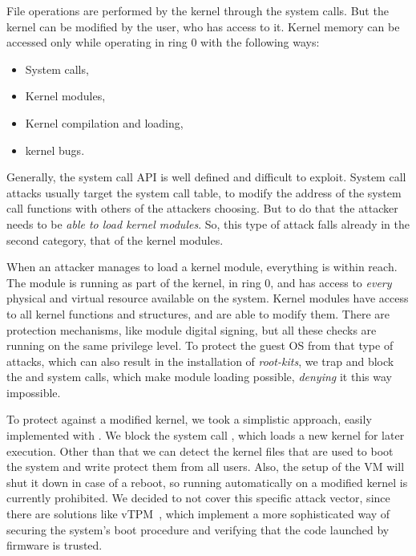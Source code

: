\par File operations are performed by the kernel through the system calls. But the kernel can be modified by the  user, who has access to it. Kernel memory can be accessed only while operating in ring 0 with the following ways:

\begin{itemize}
	\item System calls,
	\item Kernel modules,
	\item Kernel compilation and loading,
	\item kernel bugs.
\end{itemize}

\par Generally, the system call \ac{API} is well defined and difficult to exploit. System call attacks usually target the system call table, to modify the address of the system call functions with others of the attackers choosing. But to do that the attacker needs to be \emph{able to load kernel modules}. So, this type of attack falls already in the second category, that of the kernel modules.

\par When an attacker manages to load a kernel module, everything is within reach. The module is running as part of the kernel, in ring 0, and has access to \emph{every} physical and virtual resource available on the system. Kernel modules have access to all kernel functions and structures, and are able to modify them. There are protection mechanisms, like module digital signing, but all these checks are running on the same privilege level. To protect the guest \ac{OS} from that type of attacks, which can also result in the installation of \emph{root-kits}, we trap and block the  and  system calls, which make module loading possible, \emph{denying} it this way impossible.

\par To protect against a modified kernel, we took a simplistic approach, easily implemented with . We block the system call , which loads a new kernel for later execution. Other than that we can detect the kernel files that are used to boot the system and write protect them from all users. Also, the setup of the \ac{VM} will shut it down in case of a reboot, so running automatically on a modified kernel is currently prohibited. We decided to not cover this specific attack vector, since there are solutions like vTPM~\cite{perez2006vtpm}, which implement a more sophisticated way of securing the system's boot procedure and verifying that the code launched by firmware is trusted. 

